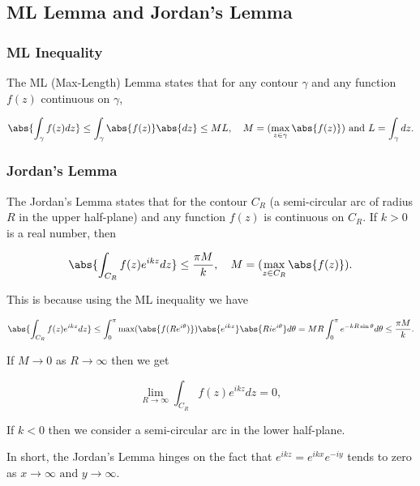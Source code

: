 \documentclass[english,a4paper,12pt]{report}
\begin{document}
\subsection{ML Lemma and Jordan's Lemma}

\subsubsection{ML Inequality}

The ML (Max-Length) Lemma states that for any contour \(\gamma \) and any function \(f(z)\) continuous on \(\gamma \),

\begin{equation}
    \abs{\int_{\gamma }^{} f(z)dz} \le \int_{\gamma }^{} \abs{f(z)}\abs{dz} \le ML, \quad M = (\max _{z \in \gamma } \abs{f(z)}) \text { and } L = \int_{\gamma }^{} dz.  
\end{equation}

\subsubsection{Jordan's Lemma}

The Jordan's Lemma states that for the contour \(C_{R} \) (a semi-circular arc of radius \(R\) in the upper half-plane) and any function \(f(z)\) is continuous on \(C_{R} \). If \(k > 0\) is a real number, then

\begin{equation}
    \abs{\int_{C_{R} }^{} f(z) e^{ikz}dz   } \le \frac{\pi M}{k}, \quad M = (\max _{z \in C_{R} } \abs{f(z)}).
\end{equation}

This is because using the ML inequality we have

\begin{equation}
    \abs{\int_{C_{R} }^{} f(z) e^{ikz}dz } \le \int_{0}^{\pi } \text{max}(\abs{f(Re^{i \theta } )}) \abs{e^{ikz} } \abs{Ri e^{i \theta } } d \theta = MR \int_{0}^{\pi } e^{-kR \sin \theta } d \theta \le  \frac{\pi M}{k}.         
\end{equation}

If \(M \to 0\) as \(R \to \infty\) then we get  

\begin{equation}
    \lim_{R \to \infty} \int_{C_{R} }^{} f(z)e^{ikz}dz = 0, 
\end{equation}

If \(k < 0\) then we consider a semi-circular arc in the lower half-plane. 

In short, the Jordan's Lemma hinges on the fact that \(e^{i kz } = e^{i kx} e^{-iy}  \) tends to zero as \(x \to \infty \text { and } y \to \infty\).  
\end{document}
